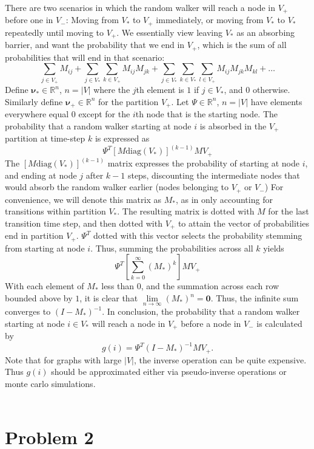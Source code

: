 \documentclass{amsart}
\begin{document}
	There are two scenarios in which the random walker will reach a node in $V_+$ before one in $V_-$: Moving from $V_*$ to $V_+$ immediately, or moving from $V_*$ to $V_*$ repeatedly until moving to $V_+$. We essentially view leaving $V_*$ as an absorbing barrier, and want the probability that we end in $V_+$, which is the sum of all probabilities that will end in that scenario:
	\[
	\sum_{j \in V_+}M_{ij} + \sum_{j \in V_*}\sum_{k \in V_+}M_{ij}M_{jk} + \sum_{j \in V_*}\sum_{k \in V_*}\sum_{l \in V_+}M_{ij}M_{jk}M_{kl} + \dots
	\]
	Define $\mathbf{\nu_*} \in \mathbb{R}^n$, $n=|V|$ where the $j$th element is $1$ if $j \in V_*$, and $0$ otherwise. Similarly define $\mathbf{\nu_+} \in \mathbb{R}^n$ for the partition $V_+$. Let $\Psi \in \mathbb{R}^n$, $n=|V|$ have elements everywhere equal 0 except for the $i$th node that is the starting node. The probability that a random walker starting at node $i$ is absorbed in the $V_+$ partition at time-step $k$ is expressed as
	\[
	\Psi^T \left[ M\text{diag}\left(V_*\right) \right]^{(k-1)} MV_+
	\]
	The $\left[ M\text{diag}\left(V_*\right) \right]^{(k-1)}$ matrix expresses the probability of starting at node $i$, and ending at node $j$ after $k-1$ steps, discounting the intermediate nodes that would absorb the random walker earlier (nodes belonging to $V_+$ or $V_-$) For convenience, we will denote this matrix as $M_*$, as in only accounting for transitions within partition $V_*$. The resulting matrix is dotted with $M$ for the last transition time step, and then dotted with $V_+$ to attain the vector of probabilities end in partition $V_+$. $\Psi^T$ dotted with this vector selects the probability stemming from starting at node $i$. Thus, summing the probabilities across all $k$ yields
	\[
	\Psi^T \left[\sum_{k=0}^{\infty}\left( M_* \right)^k\right]MV_+
	\]
	With each element of $M_*$ less than $0$, and the summation across each row bounded above by $1$, it is clear that $\lim\limits_{n \rightarrow \infty} (M_*)^n = \mathbf{0}$. Thus, the infinite sum converges to $(I-M_*)^{-1}$. In conclusion, the probability that a random walker starting at node $i \in V_*$ will reach a node in $V_+$ before a node in $V_-$ is calculated by
	\[
	g(i) = \Psi^T\left( I - M_* \right)^{-1}MV_+.
	\]
	Note that for graphs with large $|V|$, the inverse operation can be quite expensive. Thus $g(i)$ should be approximated either via pseudo-inverse operations or monte carlo simulations.
	\\\\
	\section{Problem 2}
	
	
\end{document}
